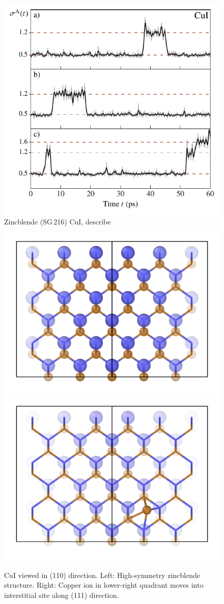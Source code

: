 \documentclass[nobib,a4paper,twoside,notoc,justified,marginals=justified]{tufte-book}
\begin{document}
\begin{figure}
	\includegraphics[width=\textwidth]{./plots/defects/216.02.CuI/sigma_vs_time.pdf}
	\caption{Zincblende (SG\,216) CuI, describe}
	\label{}
\end{figure}

\begin{figure}
	\includegraphics[width=.5\textwidth]{./plots/defects/216.02.CuI/perfect_110_solid.png} \hfill
	\includegraphics[width=.5\textwidth]{./plots/defects/216.02.CuI/defect_110.png}
	\caption{CuI viewed in (110) direction. Left: High-symmetry zincblende structure. Right: Copper ion in lower-right quadrant moves into interstitial site along (111) direction.}
	\label{}
\end{figure}
\end{document}
